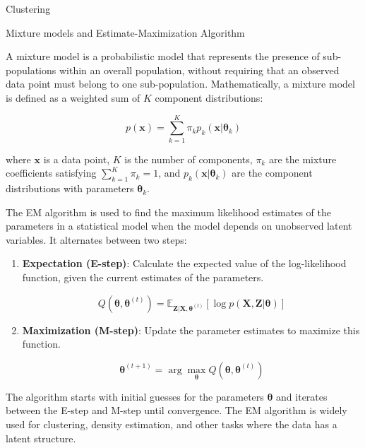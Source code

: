 \documentclass{beamer}
\begin{document}
\begin{columns}
\begin{column}{0.3\textwidth}
\begin{block}{Clustering}
\end{block}

\begin{block}{Mixture models and Estimate-Maximization Algorithm}

A mixture model is a probabilistic model that represents the presence of sub-populations within an overall population, without requiring that an observed data point must belong to one sub-population. Mathematically, a mixture model is defined as a weighted sum of $K$ component distributions:

\[
p(\mathbf{x}) = \sum_{k=1}^{K} \pi_k p_k(\mathbf{x} | \boldsymbol{\theta}_k)
\]

where $\mathbf{x}$ is a data point, $K$ is the number of components, $\pi_k$ are the mixture coefficients satisfying $\sum_{k=1}^{K} \pi_k = 1$, and $p_k(\mathbf{x} | \boldsymbol{\theta}_k)$ are the component distributions with parameters $\boldsymbol{\theta}_k$.

The EM algorithm is used to find the maximum likelihood estimates of the parameters in a statistical model when the model depends on unobserved latent variables. It alternates between two steps:

\begin{enumerate}
    \item \textbf{Expectation (E-step)}: Calculate the expected value of the log-likelihood function, given the current estimates of the parameters.
    
    \[
    Q(\boldsymbol{\theta}, \boldsymbol{\theta}^{(t)}) = \mathbb{E}_{\mathbf{Z}|\mathbf{X},\boldsymbol{\theta}^{(t)}}\left[\log p(\mathbf{X},\mathbf{Z}|\boldsymbol{\theta})\right]
    \]
    
    \item \textbf{Maximization (M-step)}: Update the parameter estimates to maximize this function.
    
    \[
    \boldsymbol{\theta}^{(t+1)} = \arg\max_{\boldsymbol{\theta}} Q(\boldsymbol{\theta}, \boldsymbol{\theta}^{(t)})
    \]
\end{enumerate}

The algorithm starts with initial guesses for the parameters $\boldsymbol{\theta}$ and iterates between the E-step and M-step until convergence. The EM algorithm is widely used for clustering, density estimation, and other tasks where the data has a latent structure.

\end{block} 

\end{column}
\end{columns}
\end{document}
